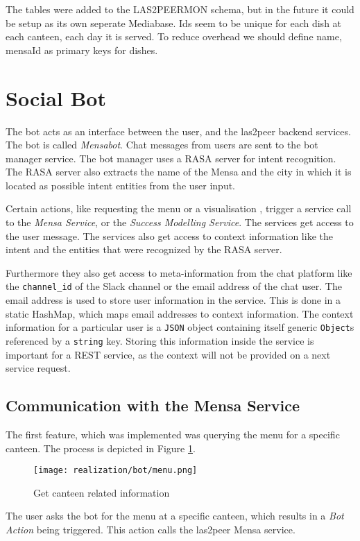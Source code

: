 The tables were added to the LAS2PEERMON schema, but in the future it could be setup as its own seperate Mediabase.
Ids seem to be unique for each dish at each canteen, each day it is served. To reduce overhead we should define name, mensaId as primary keys for dishes.


\section{Social Bot}

The bot acts as an interface between the user, and the las2peer backend services. The bot is called \emph{Mensabot}.
Chat messages from users are sent to the bot manager service. 
The bot manager uses a RASA server for intent recognition. 
The RASA server also extracts the name of the Mensa and the city in which it is located as possible intent entities from the user input.

Certain actions, like requesting the menu or a visualisation , trigger a service call to the \emph{Mensa Service}, or the \emph{Success Modelling Service}.
The services get access to the user message.  
The services also get access to context information like the intent and the entities that were recognized by the RASA server.

Furthermore they also get access to meta-information from the chat platform like the \texttt{channel\_id} of the Slack channel or the email address of the chat user. 
The email address is used to store user information in the service. This is done in a static HashMap, which maps email addresses to context information. The context information for a particular user is a \texttt{JSON} object containing itself generic \texttt{Object}s referenced by a \texttt{string} key. 
Storing this information inside the service is important for a REST service, as the context will not be provided on a next service request.

\subsection{Communication with the Mensa Service}
The first feature, which was implemented was querying the menu for a specific canteen. 
The process is depicted in Figure \ref{fig:getMenu}.
\begin{figure}[h]
    \centering
    \texttt{[image: realization/bot/menu.png]}
    \caption{Get canteen related information}
    \label{fig:getMenu}
\end{figure}
The user asks the bot for the menu at a specific canteen, which results in a \emph{Bot Action} being triggered. This action calls the las2peer Mensa service. 

